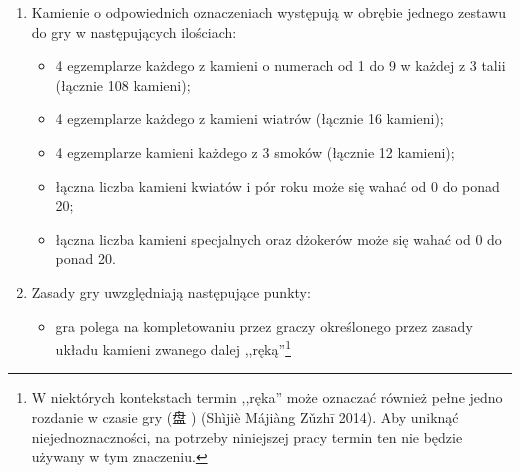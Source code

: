 \begin{enumerate}[label={\alph*)}]
\begin{itemize}
));
	  \item 3 smoki (biały (白 ), zielony
	  (發\footnotemark[\traditionalstonesfootnote] ) i czerwony (中
	  )); dopuszczalny jest także wariant, w którym zamiast smoka
	  zielonego jest smok bez przydzielonej mu barwy\footnote{,,3 Smoki'' w
	  kolorach białym, zielonym i czerwonym to zasadniczo termin zachodni, nie
	  chiński.
	  Chińczycy używają określenia ,,3 '' (三元牌 ). We wczesnych zestawach do gry w madżonga występował jednakże
	  kamień oznaczany znakiem smoka --
	  龍\footnotemark[\traditionalstonesfootnote].}
	  (龍\footnotemark[\traditionalstonesfootnote] ), a zamiast smoka
	  czerwonego -- feniks
	  (鳳\footnotemark[\traditionalstonesfootnote]);
	  \item opcjonalnie kwiaty i/lub pory roku w różnej ilości;
	  \item opcjonalnie dżoker lub inne kamienie specjalne.
	\end{itemize}
\item Kamienie o odpowiednich oznaczeniach występują w obrębie jednego zestawu
do gry w następujących ilościach:
	\begin{itemize}
	  \item 4 egzemplarze każdego z kamieni o numerach od 1 do 9 w każdej z 3 talii
	  (łącznie 108 kamieni);
	  \item 4 egzemplarze każdego z kamieni wiatrów (łącznie 16 kamieni);
	  \item 4 egzemplarze kamieni każdego z 3 smoków (łącznie 12 kamieni);
	  \item łączna liczba kamieni kwiatów i pór roku może się wahać od 0 do ponad
	  20;
	  \item łączna liczba kamieni specjalnych oraz dżokerów może się wahać od
	0 do ponad 20.
	\end{itemize} 
\item Zasady gry uwzględniają następujące punkty:
	\begin{itemize}
	  \item gra polega na kompletowaniu przez graczy określonego przez zasady
	  układu kamieni zwanego dalej ,,ręką''\footnote{\label{reka}W niektórych
	  kontekstach termin ,,ręka'' może oznaczać również pełne jedno rozdanie w czasie gry (盘
	  ) (Shìjiè Májiàng Zǔzhī 2014). Aby uniknąć niejednoznaczności,
	  na potrzeby niniejszej pracy termin ten nie będzie używany w tym znaczeniu.}

\end{itemize}
\end{enumerate}
